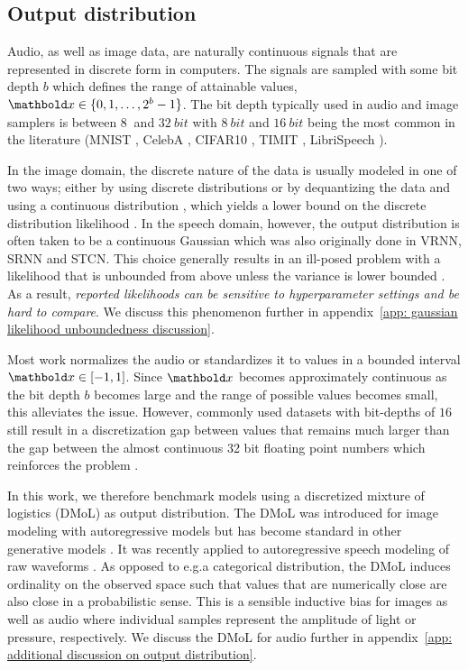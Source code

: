 \subsection{Output distribution}
Audio, as well as image data, are naturally continuous signals that are represented in discrete form in computers. The signals are sampled with some bit depth $b$ which defines the range of attainable values, $\xb\in\{0,1,\dots,2^b-1\}$. The bit depth typically used in audio and image samplers is between $\SI{8}{}$ and $\SI{32}{bit}$ with $\SI{8}{bit}$ and $\SI{16}{bit}$ being the most common in the literature (MNIST \cite{lecun_gradientbased_1998}, CelebA \cite{liu_deep_2015}, CIFAR10 \cite{krizhevsky_learning_2009}, TIMIT \cite{garofolo_timit_1993}, LibriSpeech \cite{panayotov_librispeech_2015}).

In the image domain, the discrete nature of the data is usually modeled in one of two ways; either by using discrete distributions \cite{salimans_pixelcnn_2017, maaloe_biva_2019, child_very_2021} or by dequantizing the data and using a continuous distribution \cite{dinh_nice_2015, sonderby_ladder_2016, ho_flow_2019}, which yields a lower bound on the discrete distribution likelihood \cite{theis_note_2016}. 
In the speech domain, however, the output distribution is often taken to be a continuous Gaussian \cite{hsu_unsupervised_2017,lai_stochastic_2018,zhu_s3vae_2020} which was also originally done in VRNN, SRNN and STCN. 
This choice generally results in an ill-posed problem with a likelihood that is unbounded from above unless the variance is lower bounded \cite{mattei_leveraging_2018}. As a result, \emph{reported likelihoods can be sensitive to hyperparameter settings and be hard to compare}. We discuss this phenomenon further in appendix~\cref{app: gaussian likelihood unboundedness discussion}.

Most work normalizes the audio or standardizes it to values in a bounded interval $\xb\in[-1,1]$. Since $\xb$ becomes approximately continuous as the bit depth $b$ becomes large and the range of possible values becomes small, this alleviates the issue. However, commonly used datasets with bit-depths of $\SI{16}{}$ still result in a discretization gap between values that remains much larger than the gap between the almost continuous 32 bit floating point numbers which reinforces the problem \cite{bishop_pattern_2006}.

In this work, we therefore benchmark models using a discretized mixture of logistics (DMoL) as output distribution. The DMoL was introduced for image modeling with autoregressive models \cite{salimans_pixelcnn_2017} but has become standard in other generative models \cite{maaloe_biva_2019, vahdat_nvae_2020, child_very_2021}. 
It was recently applied to autoregressive speech modeling of raw waveforms \cite{oord_parallel_2018}. 
As opposed to e.g.\@ a categorical distribution, the DMoL induces ordinality on the observed space such that values that are numerically close are also close in a probabilistic sense. This is a sensible inductive bias for images as well as audio where individual samples represent the amplitude of light or pressure, respectively. We discuss the DMoL for audio further in appendix~\cref{app: additional discussion on output distribution}.


